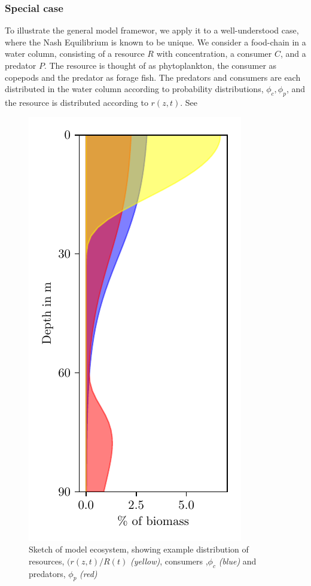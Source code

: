 
\subsubsection*{Special case}
To illustrate the general model framewor, we apply it to a well-understood case, where the Nash Equilibrium is known to be unique.
We consider a food-chain in a water column, consisting of a resource $R$ with concentration, a consumer $C$, and a predator $P$. The resource is thought of as phytoplankton, the consumer as copepods and the predator as forage fish. The predators and consumers are each distributed in the water column according to probability distributions, $\phi_c,\phi_p$, and the resource is distributed according to $r(z,t)$. See 
\begin{figure}
 \begin{centering}
   \includegraphics{plots/sketch_for_article.pdf}
 \end{centering}
 \label{fig:model_sketch}
 \caption{Sketch of model ecosystem, showing example distribution of resources, $(r(z,t)/R(t)$ \emph{(yellow)}, consumers ,$\phi_c$ \emph{(blue)} and predators, $\phi_p$ \emph{(red)}}
\end{figure}

